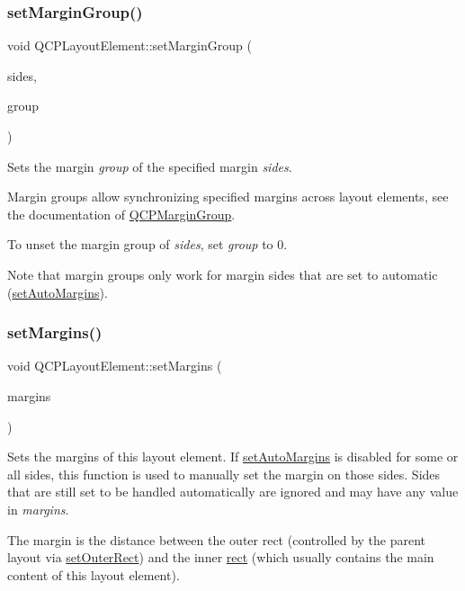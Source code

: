 \subsubsection{\texorpdfstring{set\+Margin\+Group()}{setMarginGroup()}}
{\footnotesize\ttfamily void Q\+C\+P\+Layout\+Element\+::set\+Margin\+Group (\begin{DoxyParamCaption}\item[{Q\+C\+P\+::\+Margin\+Sides}]{sides,  }\item[{\mbox{\hyperlink{class_q_c_p_margin_group}{Q\+C\+P\+Margin\+Group}} $\ast$}]{group }\end{DoxyParamCaption})}

Sets the margin {\itshape group} of the specified margin {\itshape sides}.

Margin groups allow synchronizing specified margins across layout elements, see the documentation of \mbox{\hyperlink{class_q_c_p_margin_group}{Q\+C\+P\+Margin\+Group}}.

To unset the margin group of {\itshape sides}, set {\itshape group} to 0.

Note that margin groups only work for margin sides that are set to automatic (\mbox{\hyperlink{class_q_c_p_layout_element_accfda49994e3e6d51ed14504abf9d27d}{set\+Auto\+Margins}}). \mbox{\label{class_q_c_p_layout_element_a8f450b1f3f992ad576fce2c63d8b79cf}} 
\subsubsection{\texorpdfstring{set\+Margins()}{setMargins()}}
{\footnotesize\ttfamily void Q\+C\+P\+Layout\+Element\+::set\+Margins (\begin{DoxyParamCaption}\item[{const Q\+Margins \&}]{margins }\end{DoxyParamCaption})}

Sets the margins of this layout element. If \mbox{\hyperlink{class_q_c_p_layout_element_accfda49994e3e6d51ed14504abf9d27d}{set\+Auto\+Margins}} is disabled for some or all sides, this function is used to manually set the margin on those sides. Sides that are still set to be handled automatically are ignored and may have any value in {\itshape margins}.

The margin is the distance between the outer rect (controlled by the parent layout via \mbox{\hyperlink{class_q_c_p_layout_element_a38975ea13e36de8e53391ce41d94bc0f}{set\+Outer\+Rect}}) and the inner \mbox{\hyperlink{class_q_c_p_layout_element_a208effccfe2cca4a0eaf9393e60f2dd4}{rect}} (which usually contains the main content of this layout element).

